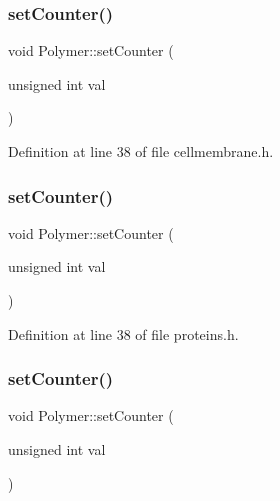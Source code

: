 \subsubsection{\texorpdfstring{set\+Counter()}{setCounter()}\hspace{0.1cm}{\footnotesize\ttfamily [2/10]}}
{\footnotesize\ttfamily void Polymer\+::set\+Counter (\begin{DoxyParamCaption}\item[{unsigned int}]{val }\end{DoxyParamCaption})\hspace{0.3cm}{\ttfamily [inline]}}



Definition at line 38 of file cellmembrane.\+h.

\mbox{\label{class_polymer_a7ed6bbe09a570b59f9253d63fd3326d2}} 
\subsubsection{\texorpdfstring{set\+Counter()}{setCounter()}\hspace{0.1cm}{\footnotesize\ttfamily [3/10]}}
{\footnotesize\ttfamily void Polymer\+::set\+Counter (\begin{DoxyParamCaption}\item[{unsigned int}]{val }\end{DoxyParamCaption})\hspace{0.3cm}{\ttfamily [inline]}}



Definition at line 38 of file proteins.\+h.

\mbox{\label{class_polymer_a7ed6bbe09a570b59f9253d63fd3326d2}} 
\subsubsection{\texorpdfstring{set\+Counter()}{setCounter()}\hspace{0.1cm}{\footnotesize\ttfamily [4/10]}}
{\footnotesize\ttfamily void Polymer\+::set\+Counter (\begin{DoxyParamCaption}\item[{unsigned int}]{val }\end{DoxyParamCaption})\hspace{0.3cm}{\ttfamily [inline]}}



